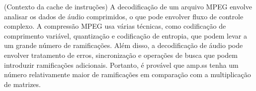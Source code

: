 \documentclass[12pt]{article}
\begin{document}
(Contexto da cache de instruções)
A decodificação de um arquivo MPEG envolve analisar os dados de áudio comprimidos, o que pode envolver fluxo de controle complexo. A compressão MPEG usa várias técnicas, como codificação de comprimento variável, quantização e codificação de entropia, que podem levar a um grande número de ramificações. Além disso, a decodificação de áudio pode envolver tratamento de erros, sincronização e operações de busca que podem introduzir ramificações adicionais. Portanto, é provável que amp.ss tenha um número relativamente maior de ramificações em comparação com a multiplicação de matrizes.
\end{document}
